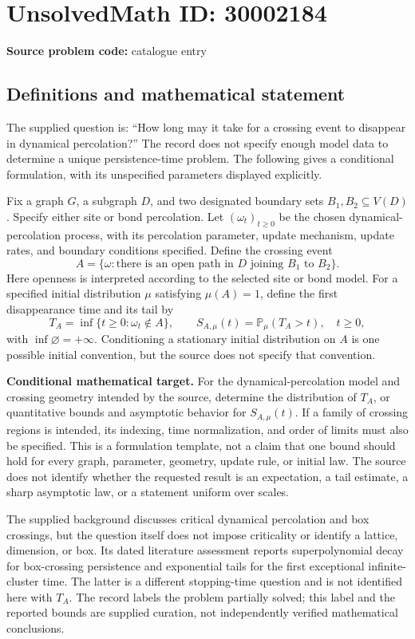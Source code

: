 \documentclass[11pt]{article}
\begin{document}
\section*{UnsolvedMath ID: 30002184}
\textbf{Source problem code:} catalogue entry
\subsection{Definitions and mathematical statement}
The supplied question is: ``How long may it take for a crossing event to disappear in dynamical percolation?'' The record does not specify enough model data to determine a unique persistence-time problem. The following gives a conditional formulation, with its unspecified parameters displayed explicitly.

Fix a graph \(G\), a subgraph \(D\), and two designated boundary sets \(B_1,B_2\subseteq V(D)\). Specify either site or bond percolation. Let \((\omega_t)_{t\geq 0}\) be the chosen dynamical-percolation process, with its percolation parameter, update mechanism, update rates, and boundary conditions specified. Define the crossing event
\[
 A=\{\omega:\text{there is an open path in }D\text{ joining }B_1\text{ to }B_2\}.
\]
Here openness is interpreted according to the selected site or bond model. For a specified initial distribution \(\mu\) satisfying \(\mu(A)=1\), define the first disappearance time and its tail by
\[
 T_A=\inf\{t\geq 0:\omega_t\notin A\},\qquad
 S_{A,\mu}(t)=\mathbb P_\mu(T_A>t),\quad t\geq 0,
\]
with \(\inf\varnothing=+\infty\). Conditioning a stationary initial distribution on \(A\) is one possible initial convention, but the source does not specify that convention.

\textbf{Conditional mathematical target.} For the dynamical-percolation model and crossing geometry intended by the source, determine the distribution of \(T_A\), or quantitative bounds and asymptotic behavior for \(S_{A,\mu}(t)\). If a family of crossing regions is intended, its indexing, time normalization, and order of limits must also be specified. This is a formulation template, not a claim that one bound should hold for every graph, parameter, geometry, update rule, or initial law. The source does not identify whether the requested result is an expectation, a tail estimate, a sharp asymptotic law, or a statement uniform over scales.

The supplied background discusses critical dynamical percolation and box crossings, but the question itself does not impose criticality or identify a lattice, dimension, or box. Its dated literature assessment reports superpolynomial decay for box-crossing persistence and exponential tails for the first exceptional infinite-cluster time. The latter is a different stopping-time question and is not identified here with \(T_A\). The record labels the problem partially solved; this label and the reported bounds are supplied curation, not independently verified mathematical conclusions.
\end{document}
